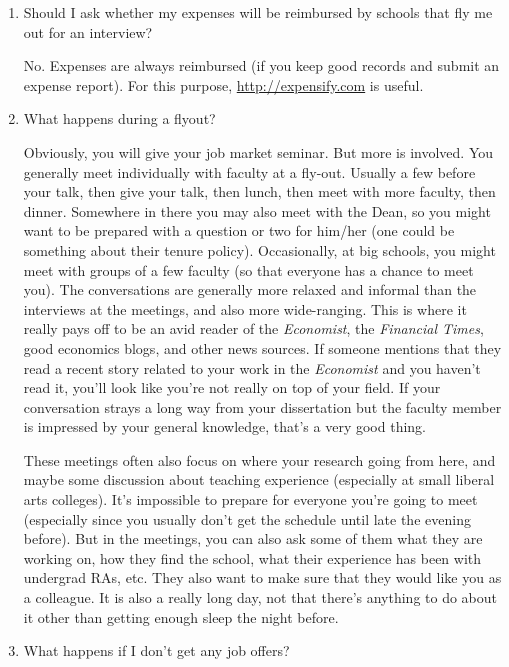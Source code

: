 \documentclass{econtex}
\begin{document}
\begin{enumerate}
\item Should I ask whether my expenses will be reimbursed by schools that fly me out for an interview?

No.  Expenses are always reimbursed (if you keep good records and submit an expense report).  For this purpose, \url{http://expensify.com} is useful.

\item What happens during a flyout?

  Obviously, you will give your job market seminar.  But more is
  involved.  You generally meet individually with faculty at a
  fly-out.  Usually a few before your talk, then give your talk, then
  lunch, then meet with more faculty, then dinner.  Somewhere in there
  you may also meet with the Dean, so you might want to be prepared
  with a question or two for him/her (one could be something about
  their tenure policy).  Occasionally, at big schools, you might meet
  with groups of a few faculty (so that everyone has a chance to meet
  you).  The conversations are generally more relaxed and informal
  than the interviews at the meetings, and also more wide-ranging.
  This is where it really pays off to be an avid reader of the {\it Economist},
the {\it Financial Times}, good economics blogs, and other news sources.
If someone mentions that they read a recent story related to your 
work in the {\it Economist} and you haven't read it, you'll look like
you're not really on top of your field.  If your conversation strays
a long way from your dissertation but the faculty member is impressed 
by your general knowledge, that's a very good thing.

These meetings often also focus on where your research going from
here, and maybe some discussion about teaching experience (especially
at small liberal arts colleges).  It's impossible to prepare for
everyone you're going to meet (especially since you usually don't get
the schedule until late the evening before).  But in the meetings, you
can also ask some of them what they are working on, how they find the
school, what their experience has been with undergrad RAs, etc.  They
also want to make sure that they would like you as a colleague.  It is
also a really long day, not that there's anything to do about it other
than getting enough sleep the night before.



\item {} 
What happens if I don't get any job offers?


\end{enumerate}
\end{document}
